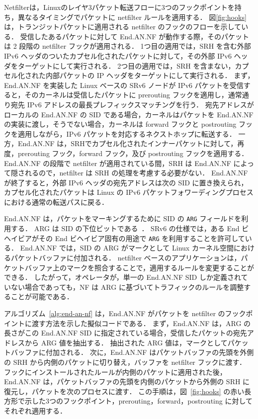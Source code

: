 Netfilterは，Linuxのレイヤ3パケット転送フローに3つのフックポイントを持ち，異なるタイミングでパケットに netfilter ルールを適用する．
図\ref*{fig:hooks} は，トランジットパケットに適用される netfilter のフックのフローを示している．
受信したあるパケットに対して End.AN.NF が動作する際，そのパケットは 2 段階の netfilter フックが適用される．
1つ目の適用では，SRH を含む外部 IPv6 ヘッダのついたカプセル化されたパケットに対して，その外部 IPv6 ヘッダをターゲットにして実行される．
2つ目の適用では，SRH を含まない，カプセル化された内部パケットの IP ヘッダをターゲットにして実行される．
まず，End.AN.NF を実装した Linux ベースの SRv6 ノードが IPv6 パケットを受信すると，そのカーネルは受信したパケットに prerouting フックを適用し，通常通り宛先 IPv6 アドレスの最長プレフィックスマッチングを行う．
宛先アドレスがローカルの End.AN.NF の SID である場合，カーネルはパケットを End.AN.NF の実装に渡し，そうでない場合，カーネルは forward フックと postrouting フックを適用しながら，IPv6 パケットを対応するネクストホップに転送する．
一方，End.AN.NF は，SRHでカプセル化されたインナーパケットに対して，再度，prerouting フック，forward フック，及び postrouting フックを適用する．
End.AN.NF の段階で netfilter が適用されている間，SRH は End.AN.NF によって隠されるので，netfilter は SRH の処理を考慮する必要がない．
End.AN.NF が終了すると，外部 IPv6 ヘッダの宛先アドレスは次の SID に置き換えられ，カプセル化されたパケットは Linux の IPv6 パケットフォワーディングプロセスにおける通常の転送パスに戻る．

End.AN.NF は，パケットをマーキングするために SID の \texttt{ARG} フィールドを利用する．
ARG は SID の下位ビットである~\cite{rfc8986}．
SRv6 の仕様では，ある End ビヘイビアがその End ビヘイビア固有の用途で \texttt{ARG} を利用することを許可している．
End.AN.NF では，SID の ARG がマークとして Linux カーネル空間におけるパケットバッファに付加される．
netfilter ベースのアプリケーションは，パケットバッファ上のマークを照合することで，適用するルールを変更することができる．
したがって，オペレータが，単一の End.AN.NF SID しか定義されていない場合であっても，NF は ARG に基づいてトラフィックのルールを調整することが可能である．

アルゴリズム~\ref*{alg:end-an-nf} は，End.AN.NF がパケットを netfilter のフックポイントに渡す方法を示した擬似コードである．
まず，End.AN.NF は，ARG の長さがこの End.AN.NF SID に指定されている場合，受信したパケットの宛先アドレスから ARG 値を抽出する．
抽出された ARG 値は，マークとしてパケットバッファに付加される．
次に，End.AN.NF はパケットバッファの先頭を外側の SRH から内側のパケットに切り替え，バッファを netfilter フックに渡す．
フックにインストールされたルールが内側のパケットに適用された後，End.AN.NF は，パケットバッファの先頭を内側のパケットから外側の SRH に復元し，パケットを次のプロセスに渡す．
この手順は，図~\ref*{fig:hooks} の赤い長方形で示した3つのフックポイント，prerouting，forward，postrouting に対してそれぞれ適用する．

